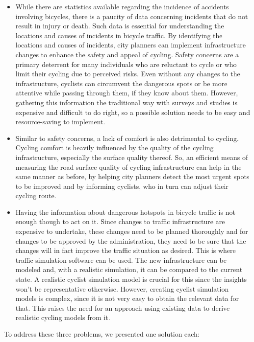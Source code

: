 \begin{itemize}
\item While there are statistics available regarding the incidence of accidents involving bicycles, there is a paucity of data concerning incidents that do not result in injury or death.
Such data is essential for understanding the locations and causes of incidents in bicycle traffic.
By identifying the locations and causes of incidents, city planners can implement infrastructure changes to enhance the safety and appeal of cycling.
Safety concerns are a primary deterrent for many individuals who are reluctant to cycle or who limit their cycling due to perceived risks.
Even without any changes to the infrastructure, cyclists can circumvent the dangerous spots or be more attentive while passing through them, if they know about them.
However, gathering this information the traditional way with surveys and studies is expensive and difficult to do right, so a possible solution needs to be easy and resource-saving to implement.
\item Similar to safety concerns, a lack of comfort is also detrimental to cycling.
Cycling comfort is heavily influenced by the quality of the cycling infrastructure, especially the surface quality thereof.
So, an efficient means of measuring the road surface quality of cycling infrastructure can help in the same manner as before, by helping city planners detect the most urgent spots to be improved and by informing cyclists, who in turn can adjust their cycling route.
\item Having the information about dangerous hotspots in bicycle traffic is not enough though to act on it.
Since changes to traffic infrastructure are expensive to undertake, these changes need to be planned thoroughly and for changes to be approved by the administration, they need to be sure that the changes will in fact improve the traffic situation as desired.
This is where traffic simulation software can be used.
The new infrastructure can be modeled and, with a realistic simulation, it can be compared to the current state.
A realistic cyclist simulation model is crucial for this since the insights won't be representative otherwise.
However, creating cyclist simulation models is complex, since it is not very easy to obtain the relevant data for that.
This raises the need for an approach using existing data to derive realistic cycling models from it.
\end{itemize}

To address these three problems, we presented one solution each:


